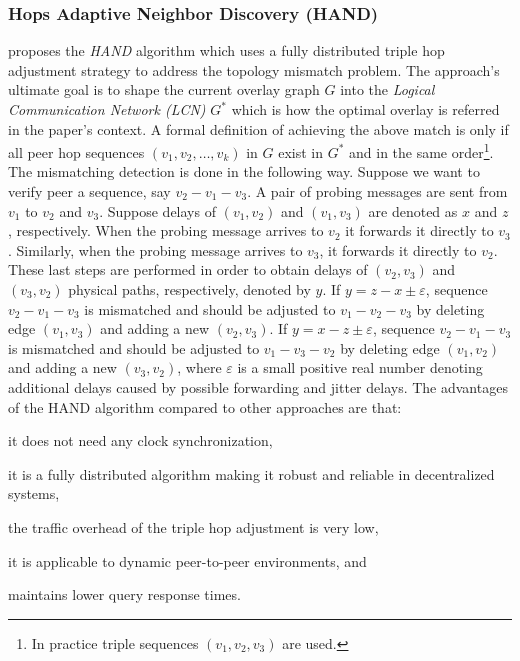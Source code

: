 \subsubsection{Hops Adaptive Neighbor Discovery (HAND)}
\cite{CLZHC2006} proposes the \emph{HAND} algorithm which uses a
fully distributed triple hop adjustment strategy to address the topology
mismatch problem. The approach's ultimate goal is to shape the current overlay
graph $G$ into the \emph{Logical Communication Network (LCN)} $G^{*}$ which is
how the optimal overlay is referred in the paper's context. A formal
definition of achieving the above match is only if all peer hop sequences $(v_1,
v_2, \ldots, v_k)$ in $G$ exist in $G^{*}$ and in the same order\footnote{In
practice triple sequences $(v_1, v_2, v_3)$ are used.}. The mismatching
detection is done in the following way. Suppose we want to verify peer a
sequence, say $v_2-v_1-v_3$. A pair of probing messages are sent from $v_1$ to
$v_2$ and $v_3$. Suppose delays of $(v_1,v_2)$ and $(v_1,v_3)$ are denoted as
$x$ and $z$, respectively. When the probing message arrives to $v_2$ it forwards
it directly to $v_3$. Similarly, when the probing message arrives to $v_3$, it
forwards it directly to $v_2$. These last steps are performed in order to obtain
delays of $(v_2,v_3)$ and $(v_3,v_2)$ physical paths, respectively, denoted by
$y$. If $y=z-x\pm\varepsilon$, sequence $v_2-v_1-v_3$ is mismatched and should
be adjusted to $v_1-v_2-v_3$ by deleting edge $(v_1,v_3)$ and adding a new
$(v_2,v_3)$. If $y=x-z\pm\varepsilon$, sequence $v_2-v_1-v_3$ is mismatched and
should be adjusted to $v_1-v_3-v_2$ by deleting edge $(v_1,v_2)$ and adding a
new $(v_3,v_2)$, where $\varepsilon$ is a small positive real number denoting
additional delays caused by possible forwarding and jitter delays. The
advantages of the HAND algorithm compared to other approaches are that:
\begin{inparaenum}
  \item it does not need any clock synchronization,
  \item it is a fully distributed algorithm making it robust and reliable in
        decentralized systems,
  \item the traffic overhead of the triple hop adjustment is very low,
  \item it is applicable to dynamic peer-to-peer environments, and
  \item maintains lower query response times.
\end{inparaenum}

